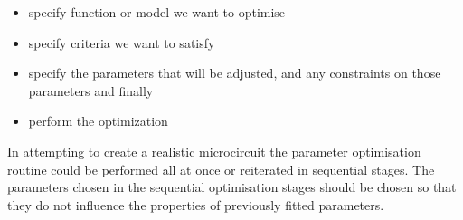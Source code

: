 \begin{itemize}
\item specify function or model we want to optimise
\item specify criteria we want to satisfy
\item specify the parameters that will be adjusted, 
    and any constraints on those parameters and finally
\item perform the optimization
\end{itemize}

In attempting to create a realistic microcircuit the parameter optimisation
routine could be performed all at once or reiterated in sequential stages. The
parameters chosen in the sequential optimisation stages should be chosen so that
they do not influence the properties of previously fitted parameters.

\medskip{}

